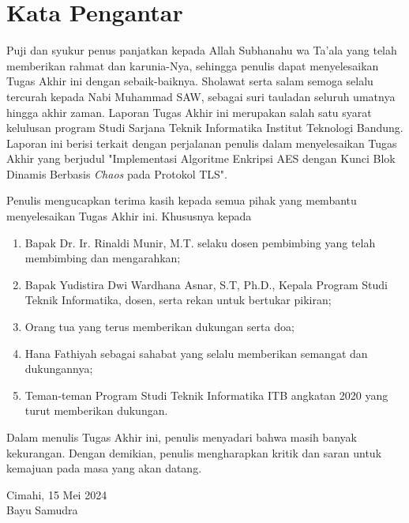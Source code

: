 \chapter*{Kata Pengantar}

Puji dan syukur penus panjatkan kepada Allah Subhanahu wa Ta'ala yang telah memberikan rahmat dan karunia-Nya, sehingga penulis dapat menyelesaikan Tugas Akhir ini dengan sebaik-baiknya. Sholawat serta salam semoga selalu tercurah kepada Nabi Muhammad SAW, sebagai suri tauladan seluruh umatnya hingga akhir zaman. Laporan Tugas Akhir ini merupakan salah satu syarat kelulusan program Studi Sarjana Teknik Informatika Institut Teknologi Bandung. Laporan ini berisi terkait dengan perjalanan penulis dalam menyelesaikan Tugas Akhir yang berjudul "Implementasi Algoritme Enkripsi AES dengan Kunci Blok Dinamis Berbasis \emph{Chaos} pada Protokol TLS".

Penulis mengucapkan terima kasih kepada semua pihak yang membantu menyelesaikan Tugas Akhir ini. Khususnya kepada
\begin{enumerate}
  \item Bapak Dr. Ir. Rinaldi Munir, M.T. selaku dosen pembimbing yang telah membimbing dan mengarahkan;
  \item Bapak Yudistira Dwi Wardhana Asnar, S.T, Ph.D., Kepala Program Studi Teknik Informatika, dosen, serta rekan untuk bertukar pikiran;
  \item Orang tua yang terus memberikan dukungan serta doa;
  \item Hana Fathiyah sebagai sahabat yang selalu memberikan semangat dan dukungannya;
  \item Teman-teman Program Studi Teknik Informatika ITB angkatan 2020 yang turut memberikan dukungan.
\end{enumerate}

Dalam menulis Tugas Akhir ini, penulis menyadari bahwa masih banyak kekurangan. Dengan demikian, penulis mengharapkan kritik dan saran untuk kemajuan pada masa yang akan datang.

\begin{flushright}
  Cimahi, 15 Mei 2024 \\


  Bayu Samudra
\end{flushright}
